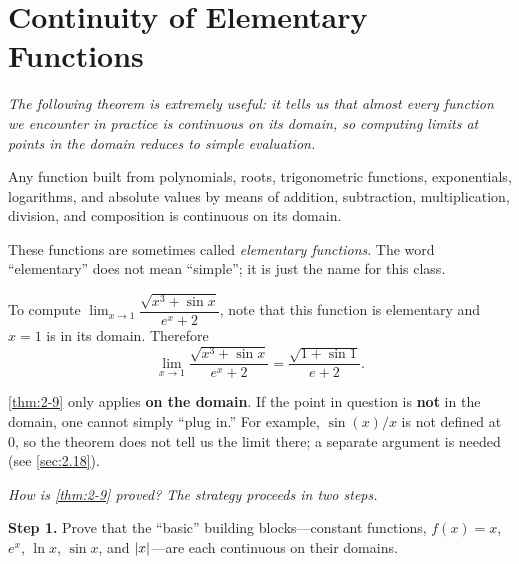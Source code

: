 \section{Continuity of Elementary Functions}
\label{sec:2.15}

\textit{The following theorem is extremely useful: it tells us that almost every function we encounter in practice is continuous on its domain, so computing limits at points in the domain reduces to simple evaluation.}

\begin{theorem}
\label{thm:2-9}
Any function built from polynomials, roots, trigonometric functions, exponentials, logarithms, and absolute values by means of addition, subtraction, multiplication, division, and composition is continuous on its domain.
\end{theorem}

\begin{remark}
These functions are sometimes called \emph{elementary functions}.  The word ``elementary'' does not mean ``simple''; it is just the name for this class.
\end{remark}

\begin{example}
\label{ex:2-10}
To compute $\lim_{x \to 1} \dfrac{\sqrt{x^{3} + \sin x}}{e^{x} + 2}$, note that this function is elementary and $x = 1$ is in its domain.  Therefore
\[
  \lim_{x \to 1} \dfrac{\sqrt{x^{3} + \sin x}}{e^{x} + 2} = \dfrac{\sqrt{1 + \sin 1}}{e + 2}.
\]
\end{example}

\begin{remark}[Warning]
\cref{thm:2-9} only applies \textbf{on the domain}.  If the point in question is \textbf{not} in the domain, one cannot simply ``plug in.''  For example, $\sin(x)/x$ is not defined at $0$, so the theorem does not tell us the limit there; a separate argument is needed (see \cref{sec:2.18}).
\end{remark}

\textit{How is \cref{thm:2-9} proved?  The strategy proceeds in two steps.}

\textbf{Step 1.}  Prove that the ``basic'' building blocks---constant functions, $f(x) = x$, $e^{x}$, $\ln x$, $\sin x$, and $\left\lvert x \right\rvert$---are each continuous on their domains.

